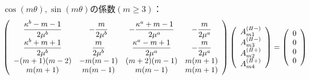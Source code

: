 $\cos(m\theta),\sin(m\theta)$の係数$(m\geq3)$：
\begin{align}
	\left(
	\begin{array}{cccc}
		{\displaystyle\frac{ \kappa^b-m-1}{2\mu^{b}}}& {\displaystyle-\frac{m}{2\mu^{b}}} &
		{\displaystyle-\frac{\kappa^a+m-1}{2\mu^{a}}} & {\displaystyle-\frac{m}{2\mu^{a}}} \\
		{\displaystyle\frac{\kappa^b+m+1}{2\mu^{b}}} & {\displaystyle\frac{m}{2\mu^{b}}} &
		{\displaystyle\frac{\kappa^a-m+1}{2\mu^{a}}} & {\displaystyle-\frac{m}{2\mu^{a}}} \\
		-(m+1)(m-2) & -m(m-1) & (m+2)(m-1) & m(m+1) \\
		m(m+1) & m(m-1) & m(m-1) & m(m+1)\\
	\end{array}
	\right)
	\left(
	\begin{array}{c}
		A_{m1}^{(I\hspace{-.15em}I-)} \\
	 	A_{m3}^{(I\hspace{-.15em}I-)} \\
		A_{m2}^{(I\hspace{-.15em}I+)}\\
	 	A_{m4}^{(I\hspace{-.15em}I+)} \\
	\end{array}
	\right)
	=
	\left(
	\begin{array}{c}
		0 \\
	 	0 \\
		0 \\
	 	0 \\
	\end{array}
	\right)
\end{align}
